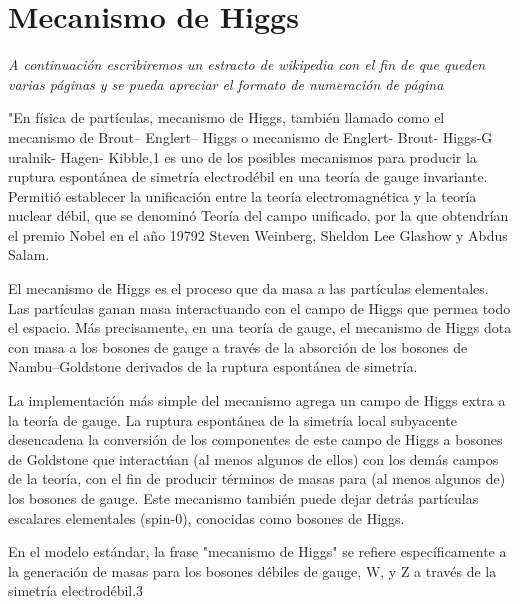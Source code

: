 \documentclass[a4paper,12pt,twoside]{book}
\begin{document}
\section{Mecanismo de Higgs}
\textit{A continuación escribiremos un estracto de wikipedia con el fin de que queden varias páginas y se pueda apreciar el formato de numeración de página}

"En física de partículas, mecanismo de Higgs, también llamado como el mecanismo de Brout– Englert– Higgs o mecanismo de Englert- Brout- Higgs-G uralnik- Hagen- Kibble,1 es uno de los posibles mecanismos para producir la ruptura espontánea de simetría electrodébil en una teoría de gauge invariante. Permitió establecer la unificación entre la teoría electromagnética y la teoría nuclear débil, que se denominó Teoría del campo unificado, por la que obtendrían el premio Nobel en el año 19792 Steven Weinberg, Sheldon Lee Glashow y Abdus Salam.

El mecanismo de Higgs es el proceso que da masa a las partículas elementales. Las partículas ganan masa interactuando con el campo de Higgs que permea todo el espacio. Más precisamente, en una teoría de gauge, el mecanismo de Higgs dota con masa a los bosones de gauge a través de la absorción de los bosones de Nambu–Goldstone derivados de la ruptura espontánea de simetría.

La implementación más simple del mecanismo agrega un campo de Higgs extra a la teoría de gauge. La ruptura espontánea de la simetría local subyacente desencadena la conversión de los componentes de este campo de Higgs a bosones de Goldstone que interactúan (al menos algunos de ellos) con los demás campos de la teoría, con el fin de producir términos de masas para (al menos algunos de) los bosones de gauge. Este mecanismo también puede dejar detrás partículas escalares elementales (spin-0), conocidas como bosones de Higgs.

En el modelo estándar, la frase "mecanismo de Higgs" se refiere específicamente a la generación de masas para los bosones débiles de gauge, W, y Z a través de la simetría electrodébil.3
\end{document}
